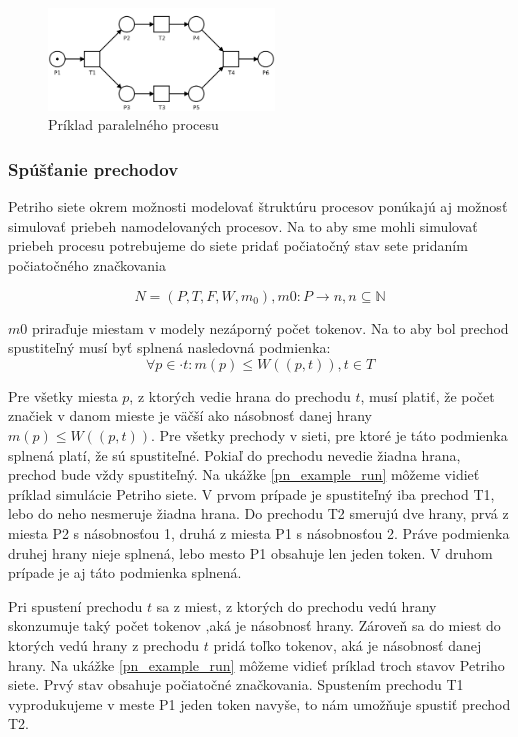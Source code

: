 \begin{figure}[!htbp]
\centering
\includegraphics[width=6cm]{img/basic_net.png}
\caption{Príklad paralelného procesu}
\label{basic_net}
\end{figure}


\subsubsection{Spúšťanie prechodov}
Petriho siete okrem možnosti modelovať štruktúru procesov ponúkajú aj možnosť simulovať priebeh namodelovaných procesov.
Na to aby sme mohli simulovať priebeh procesu potrebujeme do siete pridať počiatočný stav sete pridaním počiatočného značkovania  

\[N = (P, T, F, W, m_0 ), m0: P \rightarrow n, n \subseteq \mathbb N\]

$m0$ priraďuje miestam v modely nezáporný počet tokenov. Na to aby bol prechod spustiteľný musí byť splnená nasledovná podmienka:
\[ \forall p \in \cdot t: m(p) \leq W((p,t)), t \in T\]

Pre všetky miesta $p$, z ktorých vedie hrana do prechodu $t$, musí platiť, že počet značiek v danom mieste je väčší ako násobnosť danej hrany $ m(p) \leq W((p,t)) $. Pre všetky prechody v sieti, pre ktoré je táto podmienka splnená platí, že sú spustiteľné. Pokiaľ do prechodu nevedie žiadna hrana, prechod bude vždy spustiteľný.
Na ukážke \ref {pn_example_run} môžeme vidieť príklad simulácie Petriho siete. V prvom prípade je spustiteľný iba prechod T1, lebo do neho nesmeruje žiadna hrana. Do prechodu T2 smerujú dve hrany, prvá z miesta P2 s násobnosťou 1, druhá z miesta P1 s násobnosťou 2. Práve podmienka druhej hrany nieje splnená, lebo mesto P1 obsahuje len jeden token. V druhom prípade je aj táto podmienka splnená.
 
Pri spustení prechodu $t$ sa z miest, z ktorých do prechodu vedú hrany skonzumuje taký počet tokenov ,aká je násobnosť hrany. Zároveň sa do miest do ktorých vedú hrany z prechodu $t$ pridá toľko tokenov, aká je násobnosť danej hrany. Na ukážke \ref{pn_example_run} môžeme vidieť príklad troch stavov Petriho siete. Prvý stav obsahuje počiatočné značkovania. 
Spustením prechodu T1 vyprodukujeme v meste P1 jeden token navyše, to nám umožňuje spustiť prechod T2. 


